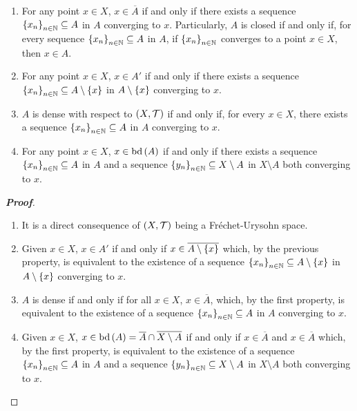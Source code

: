 \begin{proposition}
  \begin{enumerate}
    \item For any point $x\in X$, $x\in\overline{A}$ if and only if there exists a sequence $\left\{x_n\right\}_{n\in\mathbb{N}}\subseteq A$ in $A$ converging to $x$. Particularly, $A$ is closed if and only if, for every sequence $\left\{x_n\right\}_{n\in\mathbb{N}}\subseteq A$ in $A$, if $\left\{x_n\right\}_{n\in\mathbb{N}}$ converges to a point $x\in X$, then $x\in A$.
    \item For any point $x\in X$, $x\in A'$ if and only if there exists a sequence $\left\{x_n\right\}_{n\in\mathbb{N}}\subseteq A\setminus\left\{x\right\}$ in $A\setminus\left\{x\right\}$ converging to $x$.
    \item $A$ is dense with respect to $\left(X,\mathcal{T}\right)$ if and only if, for every $x\in X$, there exists a sequence $\left\{x_n\right\}_{n\in\mathbb{N}}\subseteq A$ in $A$ converging to $x$.
    \item For any point $x\in X$, $x\in\operatorname{bd}\left(A\right)$ if and only if there exists a sequence $\left\{x_n\right\}_{n\in\mathbb{N}}\subseteq A$ in $A$ and a sequence $\left\{y_n\right\}_{n\in\mathbb{N}}\subseteq X\setminus A$ in $X\setminus A$ both converging to $x$.
  \end{enumerate}
  \begin{proof}[\rm\textbf{Proof}]
    \hfill
    \begin{enumerate}
      \item It is a direct consequence of $\left(X,\mathcal{T}\right)$ being a Fréchet-Urysohn space.
      \item Given $x\in X$, $x\in A'$ if and only if $x\in\overline{A\setminus\left\{x\right\}}$ which, by the previous property, is equivalent to the existence of a sequence $\left\{x_n\right\}_{n\in\mathbb{N}}\subseteq A\setminus\left\{x\right\}$ in $A\setminus\left\{x\right\}$ converging to $x$.
      \item $A$ is dense if and only if for all $x\in X$, $x\in\overline{A}$, which, by the first property, is equivalent to the existence of a sequence $\left\{x_n\right\}_{n\in\mathbb{N}}\subseteq A$ in $A$ converging to $x$.
      \item Given $x\in X$, $x\in\operatorname{bd}\left(A\right)=\overline{A}\cap\overline{X\setminus A}$ if and only if $x\in\overline{A}$ and $x\in\overline{A}$ which, by the first property, is equivalent to the existence of a sequence $\left\{x_n\right\}_{n\in\mathbb{N}}\subseteq A$ in $A$ and a sequence $\left\{y_n\right\}_{n\in\mathbb{N}}\subseteq X\setminus A$ in $X\setminus A$ both converging to $x$.
    \end{enumerate}
  \end{proof}
\end{proposition}

